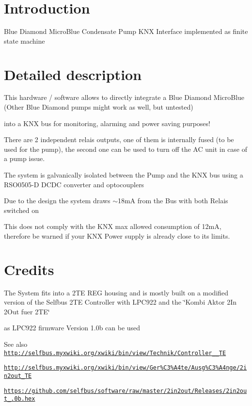 \hypertarget{index_intro_sec}{}\section{Introduction}\label{index_intro_sec}
Blue Diamond Micro\-Blue Condensate Pump K\-N\-X Interface implemented as finite state machine \hypertarget{index_descript_sec}{}\section{Detailed description}\label{index_descript_sec}
This hardware / software allows to directly integrate a Blue Diamond Micro\-Blue (Other Blue Diamond pumps might work as well, but untested) \par
 into a K\-N\-X bus for monitoring, alarming and power saving purposes! \par
 There are 2 independent relais outputs, one of them is internally fused (to be used for the pump), the second one can be used to turn off the A\-C unit in case of a pump issue. \par
 The system is galvanically isolated between the Pump and the K\-N\-X bus using a R\-S\-O0505-\/\-D D\-C\-D\-C converter and optocouplers \par
 Due to the design the system draws $\sim$18m\-A from the Bus with both Relais switched on \par
 This does not comply with the K\-N\-X max allowed consumption of 12m\-A, therefore be warned if your K\-N\-X Power supply is already close to its limits. \hypertarget{index_credit_sec}{}\section{Credits}\label{index_credit_sec}
The System fits into a 2\-T\-E R\-E\-G housing and is mostly built on a modified version of the Selfbus 2\-T\-E Controller with L\-P\-C922 and the \char`\"{}\-Kombi Aktor 2\-In 2\-Out fuer 2\-T\-E\char`\"{} \par
 as L\-P\-C922 firmware Version 1.\-0b can be used \begin{DoxySeeAlso}{See also}
\href{http://selfbus.myxwiki.org/xwiki/bin/view/Technik/Controller_922_2TE}{\tt http\-://selfbus.\-myxwiki.\-org/xwiki/bin/view/\-Technik/\-Controller\-\_\-\_\-T\-E} 

\href{http://selfbus.myxwiki.org/xwiki/bin/view/Ger%C3%A4te/Ausg%C3%A4nge/2in2out_2TE}{\tt http\-://selfbus.\-myxwiki.\-org/xwiki/bin/view/\-Ger\%\-C3\%\-A4te/\-Ausg\%\-C3\%\-A4nge/2in2out\-\_\-2\-T\-E} 

\href{https://github.com/selfbus/software/raw/master/2in2out/Releases/2in2out_1.0b.hex}{\tt https\-://github.\-com/selfbus/software/raw/master/2in2out/\-Releases/2in2out\-\_.\-0b.\-hex} 
\end{DoxySeeAlso}
